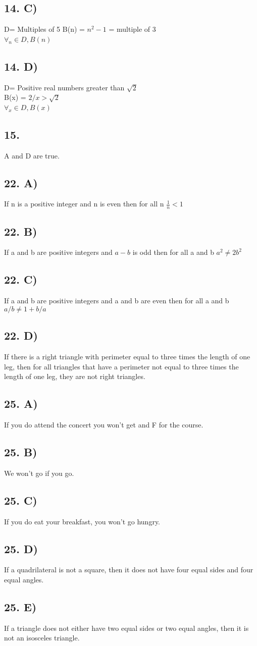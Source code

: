 \documentclass[12]{scrartcl}
\begin{document}
\subsection*{14. C)}
D= Multiples of 5
B(n) = $n^2 - 1$ = multiple of 3 \\
$\forall_n \in D, B(n)$\
\subsection*{14. D)}
D= Positive real numbers greater than $\sqrt{2}$\\
B(x) = $2/x > \sqrt{2}$\\
$\forall_x \in D, B(x)$\
\subsection*{15.}
A and D are true. 
\subsection*{22. A)}
If n is a positive integer and n is even then for all n $\frac{1}{n} < 1$ 
\subsection*{22. B)}
If a and b are positive integers and $a - b$ is odd then for all a and b $a^2 \neq 2b^2$
\subsection*{22. C)}
If a and b are positive integers and a and b are even then for all a and b $a/b \neq 1 + b/a$
\subsection*{22. D)}
If there is a right triangle with perimeter equal to three times the length of one leg, then for all triangles that have a perimeter not equal to three times the length of one leg, they are not right triangles. 
\subsection*{25. A)}
If you do attend the concert you won't get and F for the course.
\subsection*{25. B)}
We won't go if you go.
\subsection*{25. C)}
If you do eat your breakfast, you won't go hungry. 
\subsection*{25. D)}
If a quadrilateral is not a square, then it does not have four equal sides and four equal angles.
\subsection*{25. E)}
If a triangle does not either have two equal sides or two equal angles, then it is not an isosceles triangle.
\end{document}
